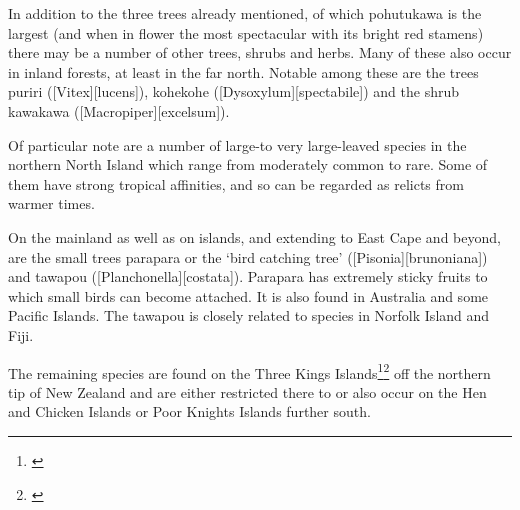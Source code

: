 In addition to the three trees already mentioned, of which pohutukawa is the largest (and when in flower the most spectacular with its bright red stamens) there may be a number of other trees, shrubs and herbs.
Many of these also occur in inland forests, at least in the far north.
Notable among these are the trees puriri ([Vitex][lucens]), kohekohe ([Dysoxylum][spectabile]) and the shrub kawakawa ([Macropiper][excelsum]).

Of particular note are a number of large-to very large-leaved species in the northern North Island which range from moderately common to rare.
Some of them have strong tropical affinities, and so can be regarded as relicts from warmer times.

On the mainland as well as on islands, and extending to East Cape and beyond, are the small trees parapara or the `bird catching tree' ([Pisonia][brunoniana]) and tawapou ([Planchonella][costata]).
Parapara has extremely sticky fruits to which small birds can become attached.
It is also found in Australia and some Pacific Islands.
The tawapou is closely related to species in Norfolk Island and Fiji.

The remaining species are found on the Three Kings Islands\footnote{\cite{baylis1948vegetation}}\footnote{\cite{oliver1948flora}} off the northern tip of New Zealand and are either restricted there to or also occur on the Hen and Chicken Islands or Poor Knights Islands further south.

